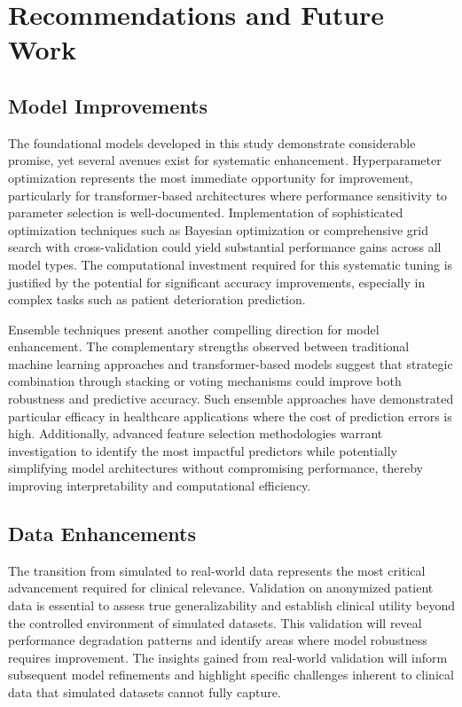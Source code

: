 \section{Recommendations and Future Work}

\subsection{Model Improvements}

The foundational models developed in this study demonstrate considerable promise, yet several avenues exist for systematic enhancement. Hyperparameter optimization represents the most immediate opportunity for improvement, particularly for transformer-based architectures where performance sensitivity to parameter selection is well-documented. Implementation of sophisticated optimization techniques such as Bayesian optimization or comprehensive grid search with cross-validation could yield substantial performance gains across all model types. The computational investment required for this systematic tuning is justified by the potential for significant accuracy improvements, especially in complex tasks such as patient deterioration prediction.

Ensemble techniques present another compelling direction for model enhancement. The complementary strengths observed between traditional machine learning approaches and transformer-based models suggest that strategic combination through stacking or voting mechanisms could improve both robustness and predictive accuracy. Such ensemble approaches have demonstrated particular efficacy in healthcare applications where the cost of prediction errors is high. Additionally, advanced feature selection methodologies warrant investigation to identify the most impactful predictors while potentially simplifying model architectures without compromising performance, thereby improving interpretability and computational efficiency.

\subsection{Data Enhancements}

The transition from simulated to real-world data represents the most critical advancement required for clinical relevance. Validation on anonymized patient data is essential to assess true generalizability and establish clinical utility beyond the controlled environment of simulated datasets. This validation will reveal performance degradation patterns and identify areas where model robustness requires improvement. The insights gained from real-world validation will inform subsequent model refinements and highlight specific challenges inherent to clinical data that simulated datasets cannot fully capture.

